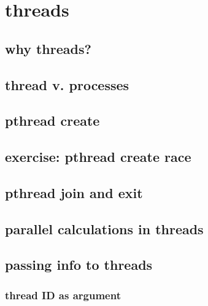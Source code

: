 
\section{threads}

\subsection{why threads?}



\subsection{thread v. processes}





\subsection{pthread create}



\subsection{exercise: pthread create race}



\subsection{pthread join and exit}



\subsection{parallel calculations in threads}







\subsection{passing info to threads}

\subsubsection{thread ID as argument}


